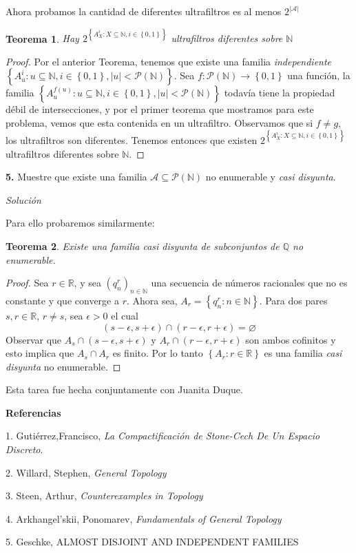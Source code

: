 \documentclass[11pt,a4paper,draft]{article}
\newtheorem{theorem}{Teorema}
\newcommand{\set}[1]{\left\lbrace #1 \right\rbrace}
\begin{document}
Ahora probamos la cantidad de diferentes ultrafiltros es al menos $  2^{\left| \mathcal{A} \right|}  $

\begin{theorem}
	Hay $ 2^{\set{A_X^i: X \subseteq \mathbb{N}, i \in \set{0,1}}} $ ultrafiltros diferentes sobre $ \mathbb{N} $
\end{theorem} 

\begin{proof}
	Por el anterior Teorema, tenemos que existe una familia \emph{independiente} $ \set{A_u^i : u \subseteq \mathbb{N}, i \in \set{0,1}, \left| u \right| < \mathcal{P}(\mathbb{N}) } $. Sea $ f:\mathcal{P}(\mathbb{N}) \rightarrow \set{0,1} $ una función, la familia   $ \set{A_u^{f(u)} : u \subseteq \mathbb{N}, i \in \set{0,1}, \left| u \right| < \mathcal{P}(\mathbb{N}) } $ todavía tiene la propiedad débil de intersecciones, y por el primer teorema que mostramos para este problema, vemos que esta contenida en un ultrafiltro. Observamos que si $ f \neq g $, los ultrafiltros son diferentes. Tenemos entonces que existen $  2^{\set{A_X^i: X \subseteq \mathbb{N}, i \in \set{0,1}}} $ ultrafiltros diferentes sobre $ \mathbb{N} $.
\end{proof}


\singlespacing


\textbf{5.} Muestre que existe una familia $ \mathcal{A} \subseteq \mathcal{P}(\mathbb{N}) $ no enumerable y \emph{casi disyunta}.

\textit{Solución}

Para ello probaremos similarmente:

\begin{theorem}
	Existe una familia \emph{casi disyunta} de subconjuntos de $ \mathbb{Q} $ no enumerable.
	
\end{theorem}

\begin{proof}
	Sea $ r \in \mathbb{R} $, y sea $ (q_n^r)_{n \in \mathbb{N}} $ una secuencia de números racionales que no es constante y que converge a $ r $. Ahora sea, $ A_r = \set{q_n^r : n \in \mathbb{N}} $. Para dos pares $ s,r \in \mathbb{R} $, $ r \neq s $, sea $ \epsilon > 0 $ el cual 
	\[ (s - \epsilon, s+\epsilon) \cap (r - \epsilon, r + \epsilon) = \varnothing \]
	Observar que $ A_s \cap (s - \epsilon, s+\epsilon)  $ y $ A_r \cap  (r - \epsilon, r + \epsilon) $ son ambos cofinitos y esto implica que $ A_s \cap A_r  $ es finito. Por lo tanto $ \set{A_r : r \in \mathbb{R}} $ es una familia \emph{casi disyunta} no enumerable.
\end{proof}

Esta tarea fue hecha conjuntamente con Juanita Duque.



\textbf{\LARGE Referencias}

1. Gutiérrez,Francisco, \textit{La Compactificación de Stone-Cech De Un Espacio Discreto}.

2. Willard, Stephen, \textit{General Topology} 

3. Steen, Arthur, \textit{Counterexamples in Topology}

4. Arkhangel'skii, Ponomarev, \textit{Fundamentals of General Topology}

5. Geschke, ALMOST DISJOINT AND INDEPENDENT FAMILIES
\end{document}
